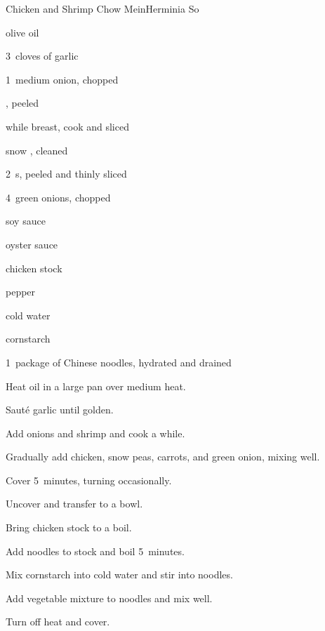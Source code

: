 \begin{recipe}{Chicken and Shrimp Chow Mein}{Herminia So}{}

\begin{ingredients}
\item \C{\quarter} olive oil
\item 3~cloves of garlic
\item 1~medium onion, chopped
\item {} , peeled
\item while  breast, cook and sliced
\item {} snow , cleaned
\item 2~s, peeled and thinly sliced
\item 4~green onions, chopped
\item {} soy sauce
\item {} oyster sauce
\item {} chicken stock
\item \tp{\half} pepper
\item \Tp{1\half} cold water
\item {} cornstarch
\item 1~package of Chinese noodles, hydrated and drained
\end{ingredients}

\begin{directions}
\item Heat oil in a large pan over medium heat.
\item Sauté garlic until golden.
\item Add onions and shrimp and cook a while.
\item Gradually add chicken, snow peas, carrots, and green onion, mixing well.
\item Cover 5~minutes, turning occasionally.
\item Uncover and transfer to a bowl.
\item Bring chicken stock to a boil.
\item Add noodles to stock and boil 5~minutes.
\item Mix cornstarch into cold water and stir into noodles.
\item Add vegetable mixture to noodles and mix well.
\item Turn off heat and cover.
\end{directions}

\end{recipe}
